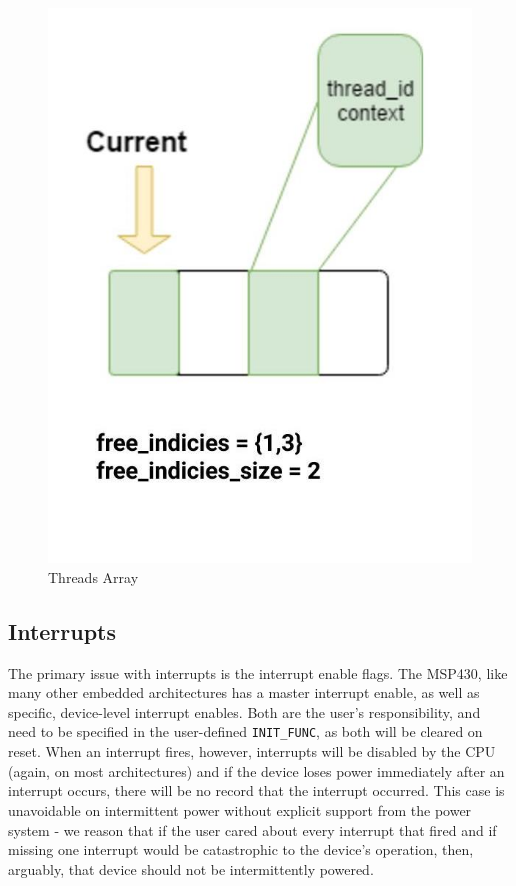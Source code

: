 \documentclass[11pt]{sensys-proc}
\begin{document}
\begin{figure}[ht]
\begin{minipage}[b]{.9\columnwidth}
  \includegraphics[width=0.7\columnwidth]{figs/threadsArray}
  \caption{Threads Array}\label{threadsArray}
\end{minipage}
\end{figure}


\subsection{Interrupts}
The primary issue with interrupts is the interrupt enable flags. The MSP430,
like many other embedded architectures has a master interrupt enable,
as well as specific, device-level interrupt enables. Both are the user's
responsibility, and need to be specified in the user-defined
\texttt{INIT\_FUNC}, as both will be cleared on reset. When an interrupt fires,
however, interrupts will be disabled by the CPU (again, on most architectures)
and if the device loses power immediately after an interrupt occurs, there will
be no record that the interrupt occurred. This case is unavoidable on
intermittent power without explicit support from the power system - we reason
that if the user cared about every interrupt that fired and if missing one
interrupt would be catastrophic to the device's operation, then, arguably, that
device should not be intermittently powered.
\end{document}

